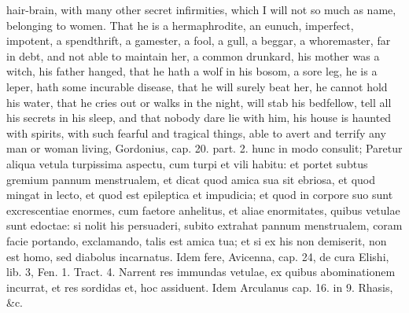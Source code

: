 hair-brain, with many other secret infirmities, which I will not so
much as name, belonging to women. That he is a hermaphrodite, an
eunuch, imperfect, impotent, a spendthrift, a gamester, a fool, a gull,
a beggar, a whoremaster, far in debt, and not able to maintain her, a
common drunkard, his mother was a witch, his father hanged, that he
hath a wolf in his bosom, a sore leg, he is a leper, hath some
incurable disease, that he will surely beat her, he cannot hold his
water, that he cries out or walks in the night, will stab his
bedfellow, tell all his secrets in his sleep, and that nobody dare lie
with him, his house is haunted with spirits, with such fearful and
tragical things, able to avert and terrify any man or woman living,
Gordonius, cap. 20. part. 2. hunc in modo consulit; Paretur aliqua
vetula turpissima aspectu, cum turpi et vili habitu: et portet subtus
gremium pannum menstrualem, et dicat quod amica sua sit ebriosa, et
quod mingat in lecto, et quod est epileptica et impudicia; et quod in
corpore suo sunt excrescentiae enormes, cum faetore anhelitus, et aliae
enormitates, quibus vetulae sunt edoctae: si nolit his persuaderi,
subito extrahat pannum menstrualem, coram facie portando,
exclamando, talis est amica tua; et si ex his non demiserit, non est
homo, sed diabolus incarnatus. Idem fere, Avicenna, cap. 24, de cura
Elishi, lib. 3, Fen. 1. Tract. 4. Narrent res immundas vetulae, ex
quibus abominationem incurrat, et res sordidas et, hoc assiduent.
Idem Arculanus cap. 16. in 9. Rhasis, \&c.

